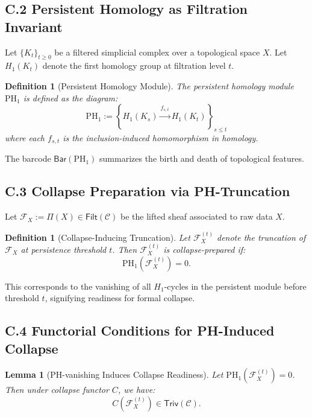 \documentclass[11pt]{article}
\newtheorem{definition}[theorem]{Definition}
\newtheorem{lemma}[theorem]{Lemma}
\begin{document}
\subsection*{C.2 Persistent Homology as Filtration Invariant}

Let \( \{ K_t \}_{t \geq 0} \) be a filtered simplicial complex over a topological space \( X \).  
Let \( H_1(K_t) \) denote the first homology group at filtration level \( t \).

\begin{definition}[Persistent Homology Module]
The persistent homology module \( \mathrm{PH}_1 \) is defined as the diagram:
\[
\mathrm{PH}_1 := \left\{ H_1(K_s) \xrightarrow{f_{s,t}} H_1(K_t) \right\}_{s \leq t}
\]
where each \( f_{s,t} \) is the inclusion-induced homomorphism in homology.
\end{definition}

The barcode \( \mathsf{Bar}(\mathrm{PH}_1) \) summarizes the birth and death of topological features.

\subsection*{C.3 Collapse Preparation via PH-Truncation}

Let \( \mathcal{F}_X := \Pi(X) \in \mathsf{Filt}(\mathcal{C}) \) be the lifted sheaf associated to raw data \( X \).

\begin{definition}[Collapse-Inducing Truncation]
Let \( \mathcal{F}_X^{(t)} \) denote the truncation of \( \mathcal{F}_X \) at persistence threshold \( t \).  
Then \( \mathcal{F}_X^{(t)} \) is \emph{collapse-prepared} if:
\[
\mathrm{PH}_1(\mathcal{F}_X^{(t)}) = 0.
\]
\end{definition}

This corresponds to the vanishing of all \( H_1 \)-cycles in the persistent module before threshold \( t \),  
signifying readiness for formal collapse.

\subsection*{C.4 Functorial Conditions for PH-Induced Collapse}

\begin{lemma}[PH-vanishing Induces Collapse Readiness]
Let \( \mathrm{PH}_1(\mathcal{F}_X^{(t)}) = 0 \). Then under collapse functor \( C \), we have:
\[
C(\mathcal{F}_X^{(t)}) \in \mathsf{Triv}(\mathcal{C}).
\]
\end{lemma}
\end{document}
